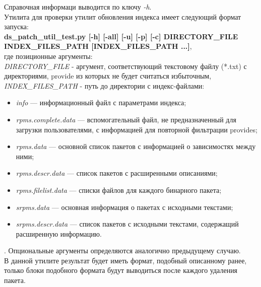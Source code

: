 Справочная информаци выводится по ключу \emph{-h}.\\

Утилита для проверки утилит обновления индекса имеет следующий формат запуска:\\
\textbf{ds\_patch\_util\_test.py [-h] [-all] [-u] [-p] [-c] DIRECTORY\_FILE INDEX\_FILES\_PATH [INDEX\_FILES\_PATH ...]},\\
 где
позиционные аргументы:\\
\emph{DIRECTORY\_FILE} - аргумент, соответствующий текстовому файлу (*.txt) с 
директориями, provide из которых не будет считаться избыточным,\\
\emph{INDEX\_FILES\_PATH} - путь до директории с индекс-файлами: \\
\begin{itemize}
\item{\textit{info} --- информационный файл с параметрами индекса;} 
\item{\textit{rpms.complete.data} --- вспомогательный файл, не предназначенный
для загрузки пользователями, с информацией для повторной фильтрации
provides;}
\item{\textit{rpms.data} --- основной список пакетов с информацией о зависимостях между ними;}
\item{\textit{rpms.descr.data} --- список пакетов с расширенными описаниями;}
\item{\textit{rpms.filelist.data} --- списки файлов для каждого бинарного пакета;}
\item{\textit{srpms.data} --- основная информация о пакетах с исходными текстами;}
\item{\textit{srpms.descr.data} --- список пакетов с исходными текстами, содержащий
расширенную информацию.}
\end{itemize}.
Опциональные аргументы определяются аналогично предыдущему случаю. \\
В данной утилите результат будет иметь  формат, подобный описанному ранее, 
только блоки подобного формата будут выводиться после каждого удаления пакета.




